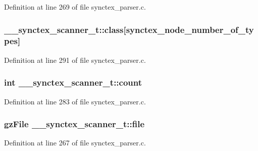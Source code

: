 Definition at line 269 of file synctex\+\_\+parser.\+c.

\hypertarget{struct____synctex__scanner__t_a5313be691a11d7f4c4dc3dfa18adb010}{
\subsubsection[{class}]{ \+\_\+\+\_\+synctex\+\_\+scanner\+\_\+t\+::class\mbox{[}{\bf synctex\+\_\+node\+\_\+number\+\_\+of\+\_\+types}\mbox{]}}}\label{struct____synctex__scanner__t_a5313be691a11d7f4c4dc3dfa18adb010}


Definition at line 291 of file synctex\+\_\+parser.\+c.

\hypertarget{struct____synctex__scanner__t_aa09bf8eca2508d26805b53e173ecfd65}{
\subsubsection[{count}]{\setlength{\rightskip}{0pt plus 5cm}int \+\_\+\+\_\+synctex\+\_\+scanner\+\_\+t\+::count}}\label{struct____synctex__scanner__t_aa09bf8eca2508d26805b53e173ecfd65}


Definition at line 283 of file synctex\+\_\+parser.\+c.

\hypertarget{struct____synctex__scanner__t_ad22da22fb23f1112ed4a8c6e54c30a91}{
\subsubsection[{file}]{\setlength{\rightskip}{0pt plus 5cm}gz\+File \+\_\+\+\_\+synctex\+\_\+scanner\+\_\+t\+::file}}\label{struct____synctex__scanner__t_ad22da22fb23f1112ed4a8c6e54c30a91}


Definition at line 267 of file synctex\+\_\+parser.\+c.

